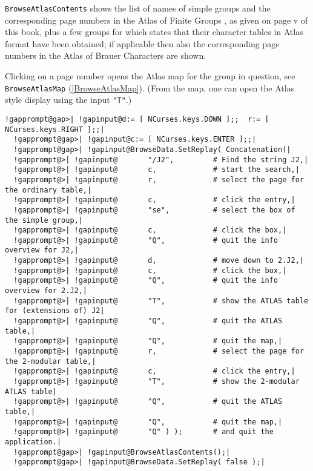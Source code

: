 \documentclass[a4paper,11pt]{report}
\begin{document}
{{{ \texttt{BrowseAtlasContents} shows the list of names of simple groups and the corresponding page numbers in
the \textsf{Atlas} of Finite Groups \cite{CCN85}, as given on page v of this book, plus a few groups for which \cite[Appendix 2]{JLPW95} states that their character tables in \textsf{Atlas} format have been obtained; if applicable then also the corresponding page
numbers in the \textsf{Atlas} of Brauer Characters \cite{JLPW95} are shown. 

 Clicking on a page number opens the \textsf{Atlas} map for the group in question, see \texttt{BrowseAtlasMap} (\ref{BrowseAtlasMap}). (From the map, one can open the \textsf{Atlas} style display using the input \texttt{"T"}.) 

 
\begin{Verbatim}[commandchars=!@|,fontsize=\small,frame=single,label=Example]
  !gapprompt@gap>| !gapinput@d:= [ NCurses.keys.DOWN ];;  r:= [ NCurses.keys.RIGHT ];;|
  !gapprompt@gap>| !gapinput@c:= [ NCurses.keys.ENTER ];;|
  !gapprompt@gap>| !gapinput@BrowseData.SetReplay( Concatenation(|
  !gapprompt@>| !gapinput@       "/J2",         # Find the string J2,|
  !gapprompt@>| !gapinput@       c,             # start the search,|
  !gapprompt@>| !gapinput@       r,             # select the page for the ordinary table,|
  !gapprompt@>| !gapinput@       c,             # click the entry,|
  !gapprompt@>| !gapinput@       "se",          # select the box of the simple group,|
  !gapprompt@>| !gapinput@       c,             # click the box,|
  !gapprompt@>| !gapinput@       "Q",           # quit the info overview for J2,|
  !gapprompt@>| !gapinput@       d,             # move down to 2.J2,|
  !gapprompt@>| !gapinput@       c,             # click the box,|
  !gapprompt@>| !gapinput@       "Q",           # quit the info overview for 2.J2,|
  !gapprompt@>| !gapinput@       "T",           # show the ATLAS table for (extensions of) J2|
  !gapprompt@>| !gapinput@       "Q",           # quit the ATLAS table,|
  !gapprompt@>| !gapinput@       "Q",           # quit the map,|
  !gapprompt@>| !gapinput@       r,             # select the page for the 2-modular table,|
  !gapprompt@>| !gapinput@       c,             # click the entry,|
  !gapprompt@>| !gapinput@       "T",           # show the 2-modular ATLAS table|
  !gapprompt@>| !gapinput@       "Q",           # quit the ATLAS table,|
  !gapprompt@>| !gapinput@       "Q",           # quit the map,|
  !gapprompt@>| !gapinput@       "Q" ) );       # and quit the application.|
  !gapprompt@gap>| !gapinput@BrowseAtlasContents();|
  !gapprompt@gap>| !gapinput@BrowseData.SetReplay( false );|
\end{Verbatim}
 }

}}
\end{document}
